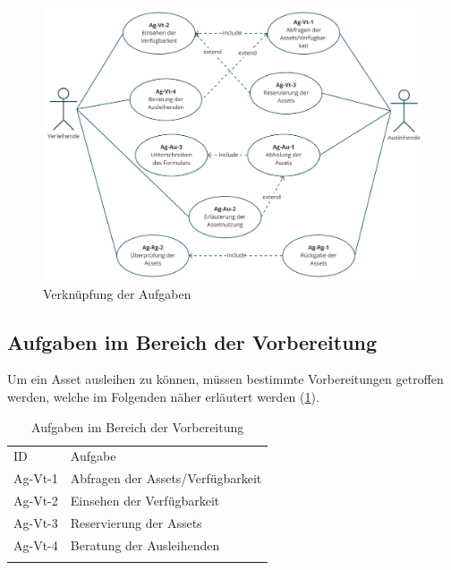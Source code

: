 \begin{figure}[h]
        \centering
        \includegraphics[scale=0.45]{Bilder/usecase1.pdf}
        \caption{Verknüpfung der Aufgaben}
        \label{fig:usecase}
\end{figure}


\subsection{Aufgaben im Bereich der Vorbereitung}
Um ein Asset ausleihen zu können, müssen bestimmte Vorbereitungen getroffen
werden, welche im Folgenden näher erläutert werden (\ref{table:Ag-Vt}).

\begin{table}[h]
        \centering
        \caption{Aufgaben im Bereich der Vorbereitung}
        \begin{tabular}{ll}
                \arrayrulecolor{maincolor}\hline
                \sffamily\color{maincolor}ID & \sffamily\color{maincolor}Aufgabe
                \\
                \arrayrulecolor{maincolor}\hline
                Ag-Vt-1                      & Abfragen der Assets/Verfügbarkeit
                \\
                Ag-Vt-2                      & Einsehen der Verfügbarkeit
                \\
                Ag-Vt-3                      & Reservierung der Assets
                \\
                Ag-Vt-4                      & Beratung der Ausleihenden
                \\
                \arrayrulecolor{maincolor}\hline
        \end{tabular}
        \label{table:Ag-Vt}
\end{table}

